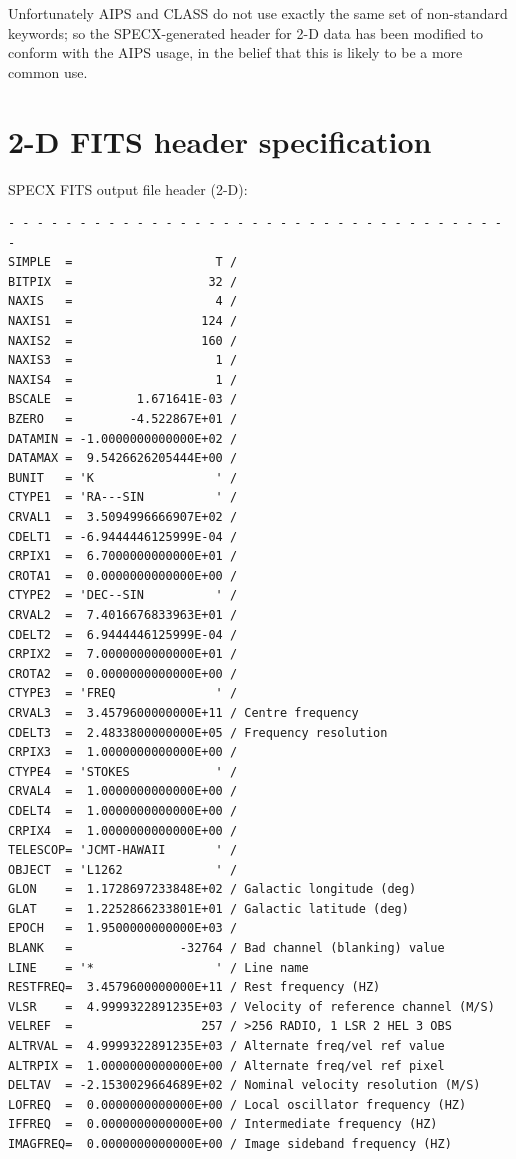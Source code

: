 \documentclass[11pt,twoside]{report}
\begin{document}
Unfortunately AIPS and CLASS do not use exactly the
same set of non-standard keywords; so the SPECX-generated header for 2-D data
has been modified to conform with the AIPS usage, in the belief that this is
likely to be a more common use.

\section{2-D FITS header specification}

SPECX FITS output file header (2-D):
\begin{verbatim}
- - - - - - - - - - - - - - - - - - - - - - - - - - - - - - - - - - - -
SIMPLE  =                    T /
BITPIX  =                   32 /
NAXIS   =                    4 /
NAXIS1  =                  124 /
NAXIS2  =                  160 /
NAXIS3  =                    1 /
NAXIS4  =                    1 /
BSCALE  =         1.671641E-03 /
BZERO   =        -4.522867E+01 /
DATAMIN = -1.0000000000000E+02 /
DATAMAX =  9.5426626205444E+00 /
BUNIT   = 'K                 ' /
CTYPE1  = 'RA---SIN          ' /
CRVAL1  =  3.5094996666907E+02 /
CDELT1  = -6.9444446125999E-04 /
CRPIX1  =  6.7000000000000E+01 /
CROTA1  =  0.0000000000000E+00 /
CTYPE2  = 'DEC--SIN          ' /
CRVAL2  =  7.4016676833963E+01 /
CDELT2  =  6.9444446125999E-04 /
CRPIX2  =  7.0000000000000E+01 /
CROTA2  =  0.0000000000000E+00 /
CTYPE3  = 'FREQ              ' /
CRVAL3  =  3.4579600000000E+11 / Centre frequency
CDELT3  =  2.4833800000000E+05 / Frequency resolution
CRPIX3  =  1.0000000000000E+00 /
CTYPE4  = 'STOKES            ' /
CRVAL4  =  1.0000000000000E+00 /
CDELT4  =  1.0000000000000E+00 /
CRPIX4  =  1.0000000000000E+00 /
TELESCOP= 'JCMT-HAWAII       ' /
OBJECT  = 'L1262             ' /
GLON    =  1.1728697233848E+02 / Galactic longitude (deg)
GLAT    =  1.2252866233801E+01 / Galactic latitude (deg)
EPOCH   =  1.9500000000000E+03 /
BLANK   =               -32764 / Bad channel (blanking) value
LINE    = '*                 ' / Line name
RESTFREQ=  3.4579600000000E+11 / Rest frequency (HZ)
VLSR    =  4.9999322891235E+03 / Velocity of reference channel (M/S)
VELREF  =                  257 / >256 RADIO, 1 LSR 2 HEL 3 OBS
ALTRVAL =  4.9999322891235E+03 / Alternate freq/vel ref value
ALTRPIX =  1.0000000000000E+00 / Alternate freq/vel ref pixel
DELTAV  = -2.1530029664689E+02 / Nominal velocity resolution (M/S)
LOFREQ  =  0.0000000000000E+00 / Local oscillator frequency (HZ)
IFFREQ  =  0.0000000000000E+00 / Intermediate frequency (HZ)
IMAGFREQ=  0.0000000000000E+00 / Image sideband frequency (HZ)

\end{verbatim}
\end{document}
